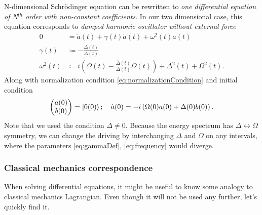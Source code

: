 N-dimensional Schr\"odinger equation can be rewritten to \emph{one differential equation of N$^{th}$ order with non-constant coefficients}. In our two dimensional case, this equation corresponds to \emph{damped harmonic oscillator without external force}
\begin{align}
    0&= \ddot a(t)+ \gamma(t) \dot a(t)+\omega^2(t)a(t) \label{eq:harmonicOscillator}\\
    \gamma(t)&\coloneqq -\frac{\dot \Delta(t)}{\Delta(t)} \label{eq:gammaDef}\\
    \omega^2(t) &\coloneqq i\left(\dot \Omega(t)-\frac{\dot\Delta(t)}{\Delta(t)}\Omega(t)\right)+\Delta^2(t)+\Omega^2(t).
    \label{eq:frequency}
\end{align}
Along with normalization condition \ref{eq:normalizationCondition} and initial condition
\begin{equation}
    \begin{pmatrix}
        a(0)\\b(0)
    \end{pmatrix}=\ket{0(0)}; \quad \dot a(0)=-i\left(\Omega(0) a(0)+\Delta(0)b(0)\right).
\end{equation}
Note that we used the condition $\Delta\neq 0$. Because the energy spectrum has $\Delta\leftrightarrow \Omega$ symmetry, we can change the driving by interchanging $\Delta$ and $\Omega$ on any intervals, where the parameters \ref{eq:gammaDef}, \ref{eq:frequency} would diverge.


\subsubsection{Classical mechanics correspondence}
When solving differential equations, it might be useful to know some analogy to classical mechanics Lagrangian. Even though it will not be used any further, let's quickly find it.


